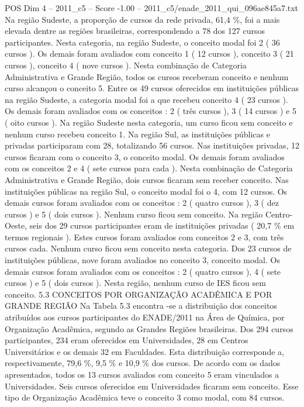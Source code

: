 \begin{textsample}{POS Dim 4 – 2011\_c5 – Score -1.00 – 2011\_c5/enade\_2011\_qui\_096ae845a7.txt}
Na região Sudeste, a proporção de cursos da rede privada, 61,4 \%, foi a mais elevada dentre as regiões brasileiras, correspondendo a 78 dos 127 cursos participantes.
Nesta categoria, na região Sudeste, o conceito modal foi 2 ( 36 cursos ).
Os demais foram avaliados com conceito 1 ( 12 cursos ), conceito 3 ( 21 cursos ), conceito 4 ( nove cursos ).
Nesta combinação de Categoria Administrativa e Grande Região, todos os cursos receberam conceito e nenhum curso alcançou o conceito 5.
Entre os 49 cursos oferecidos em instituições públicas na região Sudeste, a categoria modal foi a que recebeu conceito 4 ( 23 cursos ).
Os demais foram avaliados com os conceitos : 2 ( três cursos ), 3 ( 14 cursos ) e 5 ( oito cursos ).
Na região Sudeste nesta categoria, um curso ficou sem conceito e nenhum curso recebeu conceito 1.
Na região Sul, as instituições públicas e privadas participaram com 28, totalizando 56 cursos.
Nas instituições privadas, 12 cursos ficaram com o conceito 3, o conceito modal.
Os demais foram avaliados com os conceitos 2 e 4 ( sete cursos para cada ).
Nesta combinação de Categoria Administrativa e Grande Região, dois cursos ficaram sem receber conceito.
Nas instituições públicas na região Sul, o conceito modal foi o 4, com 12 cursos.
Os demais cursos foram avaliados com os conceitos : 2 ( quatro cursos ), 3 ( dez cursos ) e 5 ( dois cursos ).
Nenhum curso ficou sem conceito.
Na região Centro-Oeste, seis dos 29 cursos participantes eram de instituições privadas ( 20,7 \% em termos regionais ).
Estes cursos foram avaliados com conceitos 2 e 3, com três cursos cada.
Nenhum curso ficou sem conceito nesta categoria.
Dos 23 cursos de instituições públicas, nove foram avaliados no conceito 3, conceito modal.
Os demais cursos foram avaliados com os conceitos : 2 ( quatro cursos ), 4 ( sete cursos ) e 5 ( dois cursos ).
Nesta região, nenhum curso de IES ficou sem conceito. 5.3 CONCEITOS POR ORGANIZAÇÃO ACADÊMICA E POR GRANDE REGIÃO Na Tabela 5.3 encontra -se a distribuição dos conceitos atribuídos aos cursos participantes do ENADE/2011 na Área de Química, por Organização Acadêmica, segundo as Grandes Regiões brasileiras.
Dos 294 cursos participantes, 234 eram oferecidos em Universidades, 28 em Centros Universitários e os demais 32 em Faculdades.
Esta distribuição corresponde a, respectivamente, 79,6 \%, 9,5 \% e 10,9 \% dos cursos.
De acordo com os dados apresentados, todos os 13 cursos avaliados com conceito 5 eram vinculados a Universidades.
Seis cursos oferecidos em Universidades ficaram sem conceito.
Esse tipo de Organização Acadêmica teve o conceito 3 como modal, com 84 cursos.

\end{textsample}

